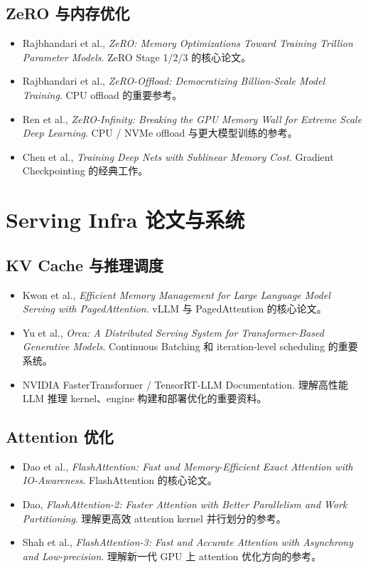 \subsection{ZeRO 与内存优化}

\begin{itemize}
\item Rajbhandari et al., \textit{ZeRO: Memory Optimizations Toward Training Trillion Parameter Models}. ZeRO Stage 1/2/3 的核心论文。
\item Rajbhandari et al., \textit{ZeRO-Offload: Democratizing Billion-Scale Model Training}. CPU offload 的重要参考。
\item Ren et al., \textit{ZeRO-Infinity: Breaking the GPU Memory Wall for Extreme Scale Deep Learning}. CPU / NVMe offload 与更大模型训练的参考。
\item Chen et al., \textit{Training Deep Nets with Sublinear Memory Cost}. Gradient Checkpointing 的经典工作。
\end{itemize}

\section{Serving Infra 论文与系统}

\subsection{KV Cache 与推理调度}

\begin{itemize}
\item Kwon et al., \textit{Efficient Memory Management for Large Language Model Serving with PagedAttention}. vLLM 与 PagedAttention 的核心论文。
\item Yu et al., \textit{Orca: A Distributed Serving System for Transformer-Based Generative Models}. Continuous Batching 和 iteration-level scheduling 的重要系统。
\item NVIDIA FasterTransformer / TensorRT-LLM Documentation. 理解高性能 LLM 推理 kernel、engine 构建和部署优化的重要资料。
\end{itemize}

\subsection{Attention 优化}

\begin{itemize}
\item Dao et al., \textit{FlashAttention: Fast and Memory-Efficient Exact Attention with IO-Awareness}. FlashAttention 的核心论文。
\item Dao, \textit{FlashAttention-2: Faster Attention with Better Parallelism and Work Partitioning}. 理解更高效 attention kernel 并行划分的参考。
\item Shah et al., \textit{FlashAttention-3: Fast and Accurate Attention with Asynchrony and Low-precision}. 理解新一代 GPU 上 attention 优化方向的参考。
\end{itemize}

